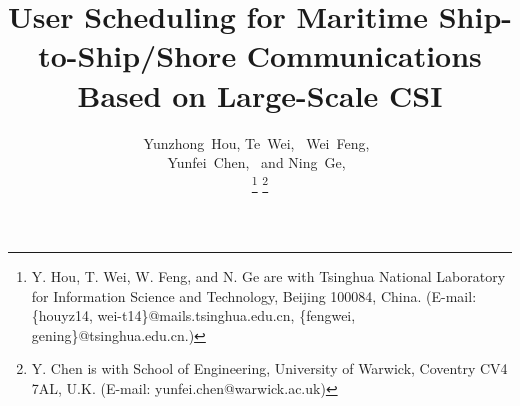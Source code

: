 \documentclass[journal]{IEEEtran}
\begin{document}
   \title{User Scheduling for Maritime Ship-to-Ship/Shore Communications Based on Large-Scale CSI}
   \author{Yunzhong~Hou, Te~Wei,~  Wei~Feng,~ \\ Yunfei~Chen,~  and Ning~Ge,~
    
   
   
   \thanks{Y. Hou, T. Wei, W. Feng, and N. Ge are with Tsinghua National Laboratory for Information Science and Technology, Beijing 100084, China. (E-mail: \{houyz14, wei-t14\}@mails.tsinghua.edu.cn, \{fengwei, gening\}@tsinghua.edu.cn.)}
   \thanks{Y. Chen is with School of Engineering, University of Warwick, Coventry CV4 7AL, U.K. (E-mail: yunfei.chen@warwick.ac.uk)}
   }
   
   
   
   
    
   
   \maketitle
   
\end{document}
